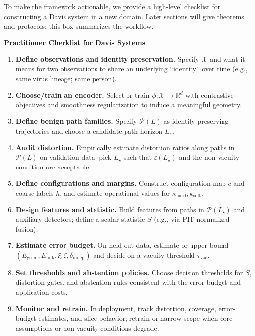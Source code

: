 \documentclass[11pt]{article}
\begin{document}
To make the framework actionable, we provide a high-level checklist for constructing a
Davis system in a new domain. Later sections will give theorems and protocols; this box
summarizes the workflow.

\begin{samepage}
\begin{mdframed}[linewidth=0.5pt]
\noindent\textbf{Practitioner Checklist for Davis Systems}
\begin{enumerate}[leftmargin=*]
    \item \textbf{Define observations and identity preservation.} Specify $\mathcal{X}$ and what it
    means for two observations to share an underlying ``identity'' over time (e.g., same virus
    lineage; same person).

    \item \textbf{Choose/train an encoder.} Select or train $\phi:\mathcal{X}\to\mathbb{R}^d$
    with contrastive objectives and smoothness regularization to induce a meaningful geometry.

    \item \textbf{Define benign path families.} Specify $\mathcal{P}(L)$ as identity-preserving
    trajectories and choose a candidate path horizon $L_\star$.

    \item \textbf{Audit distortion.} Empirically estimate distortion ratios along paths in
    $\mathcal{P}(L)$ on validation data; pick $L_\star$ such that $\varepsilon(L_\star)$ and the
    non-vacuity condition are acceptable.

    \item \textbf{Define configurations and margins.} Construct configuration map $c$ and coarse
    labels $h$, and estimate operational values for $\kappa_{\mathrm{hard}},\kappa_{\mathrm{soft}}$.

    \item \textbf{Design features and statistic.} Build features from paths in $\mathcal{P}(L_\star)$
    and auxiliary detectors; define a scalar statistic $S$ (e.g., via PIT-normalized fusion).

    \item \textbf{Estimate error budget.} On held-out data, estimate or upper-bound
    $(E_{\text{geom}},E_{\text{link}},\xi,\zeta,\delta_{\text{indep}})$ and decide on a vacuity
    threshold $\tau_{\text{vac}}$.

    \item \textbf{Set thresholds and abstention policies.} Choose decision thresholds for $S$,
    distortion gates, and abstention rules consistent with the error budget and application costs.

    \item \textbf{Monitor and retrain.} In deployment, track distortion, coverage, error-budget
    estimates, and slice behavior; retrain or narrow scope when core assumptions or non-vacuity
    conditions degrade.
\end{enumerate}
\end{mdframed}
\end{samepage}
\end{document}
